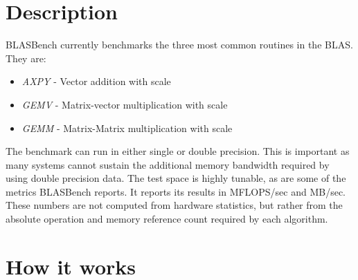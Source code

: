 \documentclass [12pt]{article}
\begin{document}
\section{Description}

BLASBench currently benchmarks the three most common routines in the
BLAS. They are:

\begin{itemize}
\item {\em AXPY} - Vector addition with scale
\item {\em GEMV} - Matrix-vector multiplication with scale
\item {\em GEMM} - Matrix-Matrix multiplication with scale
\end{itemize}

The benchmark can run in either single or double precision. This is
important as many systems cannot sustain the additional memory
bandwidth required by using double precision data. The
test space is highly tunable, as are some of the metrics BLASBench reports. 
It reports its results in MFLOPS/sec and MB/sec. These
numbers are not computed from hardware statistics, but rather from the
absolute operation and memory reference count required by each
algorithm.

\section{How it works}
\end{document}
